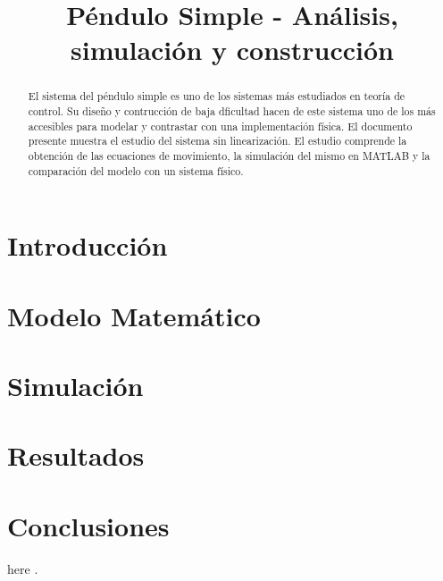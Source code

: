 \documentclass[journal, onecolumn]{IEEEtran}
\begin{document}
\title{
Péndulo Simple - Análisis, simulación y construcción\\
}


\author{
}

\maketitle

\begin{abstract}

El sistema del péndulo simple es uno de los sistemas más estudiados
en teoría de control. 
Su diseño y contrucción de baja dficultad hacen de este sistema uno de
los más accesibles para modelar y contrastar con una implementación
física.
El documento presente muestra el estudio del sistema sin linearización.
El estudio comprende la obtención de las ecuaciones de movimiento,
la simulación del mismo en MATLAB y la comparación del modelo con
un sistema físico.


\end{abstract}


\section{Introducción}


\section{Modelo Matemático}


\section{Simulación}


\section{Resultados}


\section{Conclusiones}


here \cite{susskind}.



\end{document}
